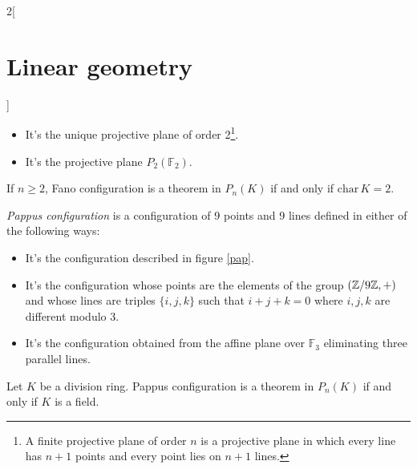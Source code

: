\documentclass[../../../main.tex]{subfiles}
\begin{document}
\begin{multicols}{2}[\section{Linear geometry}]
\begin{definition}
\begin{itemize}
\begin{center}
\begin{minipage}{\linewidth}
                          \label{fan}
                      \end{minipage}
                  \end{center}
            \item It's the unique projective plane of order 2\footnote{A finite projective plane of order $n$ is a  projective plane in which every line has $n+1$ points and every point lies on $n+1$ lines.}.
            \item It's the projective plane $P_2(\mathbb{F}_2)$.
        \end{itemize}
    \end{definition}
    \begin{theorem}
        If $n\geq 2$, Fano configuration is a theorem in $P_n(K)$ if and only if $\text{char}\,K=2$.
    \end{theorem}
    \begin{definition}
        \textit{Pappus configuration} is a configuration of 9 points and 9 lines defined in either of the following ways:
        \begin{itemize}
            \item It's the configuration described in figure \ref{pap}.
                  \begin{center}
                      \begin{minipage}{\linewidth}
                          \centering
                          
                          \label{pap}
                      \end{minipage}
                  \end{center}
            \item It's the configuration whose points are the elements of the group $(\mathbb{Z} /9\mathbb{Z} ,+)$ and whose lines are triples $\{i,j,k\}$ such that $i+j+k=0$ where $i,j,k$ are different modulo 3.
            \item It's the configuration obtained from the affine plane over $\mathbb{F}_3$ eliminating three parallel lines.
        \end{itemize}
    \end{definition}
    \begin{theorem}
        Let $K$ be a division ring. Pappus configuration is a theorem in $P_n(K)$ if and only if $K$ is a field.
    \end{theorem}

\end{multicols}
\end{document}
